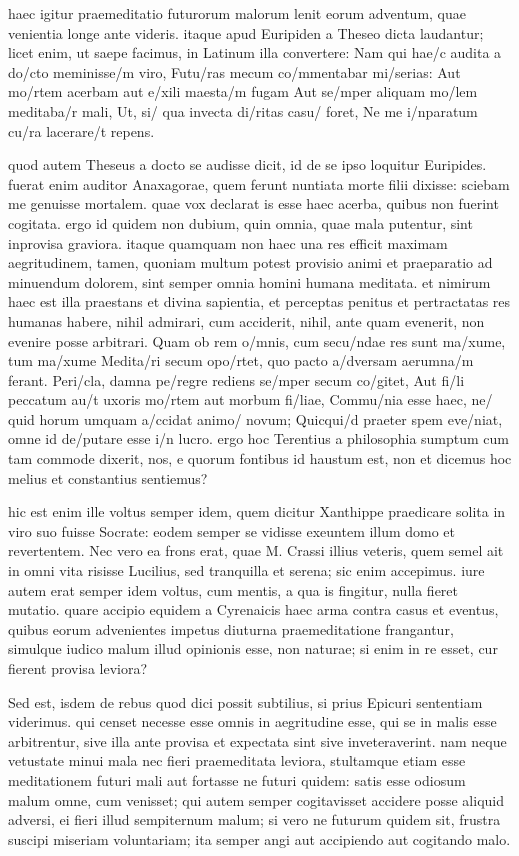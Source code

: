  haec igitur praemeditatio futurorum malorum lenit eorum adventum, quae venientia longe ante videris. itaque apud Euripiden a Theseo dicta laudantur; licet enim, ut saepe facimus, in Latinum illa convertere: Nam qui hae/c audita a do/cto meminisse/m viro, Futu/ras mecum co/mmentabar mi/serias: Aut mo/rtem acerbam aut e/xili maesta/m fugam Aut se/mper aliquam mo/lem meditaba/r mali, Ut, si/ qua invecta di/ritas casu/ foret, Ne me i/nparatum cu/ra lacerare/t repens.

 quod autem Theseus a docto se audisse dicit, id de se ipso loquitur Euripides. fuerat enim auditor Anaxagorae, quem ferunt nuntiata morte filii dixisse: sciebam me genuisse mortalem. quae vox declarat is esse haec acerba, quibus non fuerint cogitata. ergo id quidem non dubium, quin omnia, quae mala putentur, sint inprovisa graviora. itaque quamquam non haec una res efficit maximam aegritudinem, tamen, quoniam multum potest provisio animi et praeparatio ad minuendum dolorem, sint semper omnia homini humana meditata. et nimirum haec est illa praestans et divina sapientia, et perceptas penitus et pertractatas res humanas habere, nihil admirari, cum acciderit, nihil, ante quam evenerit, non evenire posse arbitrari. Quam ob rem o/mnis, cum secu/ndae res sunt ma/xume, tum ma/xume Medita/ri secum opo/rtet, quo pacto a/dversam aerumna/m ferant. Peri/cla, damna pe/regre rediens se/mper secum co/gitet, Aut fi/li peccatum au/t uxoris mo/rtem aut morbum fi/liae, Commu/nia esse haec, ne/ quid horum umquam a/ccidat animo/ novum; Quicqui/d praeter spem eve/niat, omne id de/putare esse i/n lucro. ergo hoc Terentius a philosophia sumptum cum tam commode dixerit, nos, e quorum fontibus id haustum est, non et dicemus hoc melius et constantius sentiemus?

 hic est enim ille voltus semper idem, quem dicitur Xanthippe praedicare solita in viro suo fuisse Socrate: eodem semper se vidisse exeuntem illum domo et revertentem. Nec vero ea frons erat, quae M. Crassi illius veteris, quem semel ait in omni vita risisse Lucilius, sed tranquilla et serena; sic enim accepimus. iure autem erat semper idem voltus, cum mentis, a qua is fingitur, nulla fieret mutatio. quare accipio equidem a Cyrenaicis haec arma contra casus et eventus, quibus eorum advenientes impetus diuturna praemeditatione frangantur, simulque iudico malum illud opinionis esse, non naturae; si enim in re esset, cur fierent provisa leviora?

 Sed est, isdem de rebus quod dici possit subtilius, si prius Epicuri sententiam viderimus. qui censet necesse esse omnis in aegritudine esse, qui se in malis esse arbitrentur, sive illa ante provisa et expectata sint sive inveteraverint. nam neque vetustate minui mala nec fieri praemeditata leviora, stultamque etiam esse meditationem futuri mali aut fortasse ne futuri quidem: satis esse odiosum malum omne, cum venisset; qui autem semper cogitavisset accidere posse aliquid adversi, ei fieri illud sempiternum malum; si vero ne futurum quidem sit, frustra suscipi miseriam voluntariam; ita semper angi aut accipiendo aut cogitando malo.

